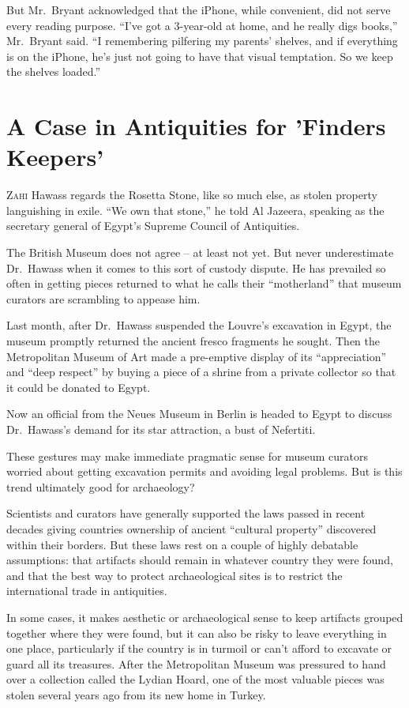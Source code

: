 ﻿\documentclass[12pt]{article}
\begin{document}
But Mr.~Bryant acknowledged that the iPhone, while convenient, did not serve every reading purpose.
``I've got a 3-year-old at home, and he really digs books,'' Mr.~Bryant said. ``I remembering
pilfering my parents' shelves, and if everything is on the iPhone, he's just not going to have that
visual temptation. So we keep the shelves loaded.''

\section{A Case in Antiquities for 'Finders Keepers'}

\lettrine{Z}{ahi} Hawass regards the Rosetta Stone, like so much else, as
stolen property languishing in exile. ``We own that stone,'' he told Al Jazeera, speaking as the
secretary general of Egypt's Supreme Council of Antiquities.

The British Museum does not agree -- at least not yet. But never underestimate Dr.~Hawass when it
comes to this sort of custody dispute. He has prevailed so often in getting pieces returned to what
he calls their ``motherland'' that museum curators are scrambling to appease him.

Last month, after Dr.~Hawass suspended the Louvre's excavation in Egypt, the museum promptly
returned the ancient fresco fragments he sought. Then the Metropolitan Museum of Art made a
pre-emptive display of its ``appreciation'' and ``deep respect'' by buying a piece of a shrine from
a private collector so that it could be donated to Egypt.

Now an official from the Neues Museum in Berlin is headed to Egypt to discuss Dr.~Hawass's demand
for its star attraction, a bust of Nefertiti.

These gestures may make immediate pragmatic sense for museum curators worried about getting
excavation permits and avoiding legal problems. But is this trend ultimately good for archaeology?

Scientists and curators have generally supported the laws passed in recent decades giving countries
ownership of ancient ``cultural property'' discovered within their borders. But these laws rest on a
couple of highly debatable assumptions: that artifacts should remain in whatever country they were
found, and that the best way to protect archaeological sites is to restrict the international trade
in antiquities.

In some cases, it makes aesthetic or archaeological sense to keep artifacts grouped together where
they were found, but it can also be risky to leave everything in one place, particularly if the
country is in turmoil or can't afford to excavate or guard all its treasures. After the Metropolitan
Museum was pressured to hand over a collection called the Lydian Hoard, one of the most valuable
pieces was stolen several years ago from its new home in Turkey.
\end{document}
